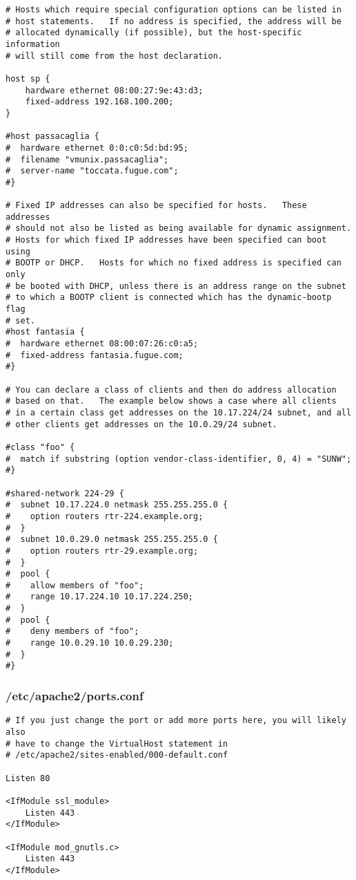 \begin{lstlisting}
# Hosts which require special configuration options can be listed in
# host statements.   If no address is specified, the address will be
# allocated dynamically (if possible), but the host-specific information
# will still come from the host declaration.

host sp {
	hardware ethernet 08:00:27:9e:43:d3;
	fixed-address 192.168.100.200;
}

#host passacaglia {
#  hardware ethernet 0:0:c0:5d:bd:95;
#  filename "vmunix.passacaglia";
#  server-name "toccata.fugue.com";
#}

# Fixed IP addresses can also be specified for hosts.   These addresses
# should not also be listed as being available for dynamic assignment.
# Hosts for which fixed IP addresses have been specified can boot using
# BOOTP or DHCP.   Hosts for which no fixed address is specified can only
# be booted with DHCP, unless there is an address range on the subnet
# to which a BOOTP client is connected which has the dynamic-bootp flag
# set.
#host fantasia {
#  hardware ethernet 08:00:07:26:c0:a5;
#  fixed-address fantasia.fugue.com;
#}

# You can declare a class of clients and then do address allocation
# based on that.   The example below shows a case where all clients
# in a certain class get addresses on the 10.17.224/24 subnet, and all
# other clients get addresses on the 10.0.29/24 subnet.

#class "foo" {
#  match if substring (option vendor-class-identifier, 0, 4) = "SUNW";
#}

#shared-network 224-29 {
#  subnet 10.17.224.0 netmask 255.255.255.0 {
#    option routers rtr-224.example.org;
#  }
#  subnet 10.0.29.0 netmask 255.255.255.0 {
#    option routers rtr-29.example.org;
#  }
#  pool {
#    allow members of "foo";
#    range 10.17.224.10 10.17.224.250;
#  }
#  pool {
#    deny members of "foo";
#    range 10.0.29.10 10.0.29.230;
#  }
#}
\end{lstlisting}

\subsubsection{/etc/apache2/ports.conf}
\begin{lstlisting}
# If you just change the port or add more ports here, you will likely also
# have to change the VirtualHost statement in
# /etc/apache2/sites-enabled/000-default.conf

Listen 80

<IfModule ssl_module>
	Listen 443
</IfModule>

<IfModule mod_gnutls.c>
	Listen 443
</IfModule>
\end{lstlisting}

